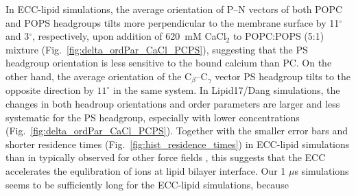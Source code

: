 \documentclass[journal=jpcbfk,manuscript=article]{achemso}
\begin{document}
In ECC-lipid simulations, the average orientation of P--N vectors of both POPC and POPS headgroups tilts more perpendicular to the membrane surface
by 11$^\circ$ and  3$^\circ$, respectively, upon addition of 620~mM CaCl$_2$ to POPC:POPS (5:1) mixture (Fig.~\ref{fig:delta_ordPar_CaCl_PCPS}),
suggesting that the PS headgroup orientation is less sensitive to the bound calcium than PC.
On the other hand, the average orientation of the C$_{\beta}$--C$_{\gamma}$ vector PS headgroup
tilts to the opposite direction by $11^\circ$ in the same system.
In Lipid17/Dang simulations, the changes in both headroup orientations and order parameters
are larger and less systematic for the PS headgroup, especially with lower concentrations (Fig.~\ref{fig:delta_ordPar_CaCl_PCPS}).
Together with the smaller error bars and shorter residence times (Fig.~\ref{fig:hist_residence_times}) in
ECC-lipid simulations than in typically observed for other force fields \cite{javanainen17,melcr18,NMRlipidsIV},
this suggests that the ECC accelerates the equlibration of ions at lipid bilayer interface.
%
%
%
Our 1 $\mu$s simulations seems to be sufficiently long for the ECC-lipid simulations, because
\end{document}
